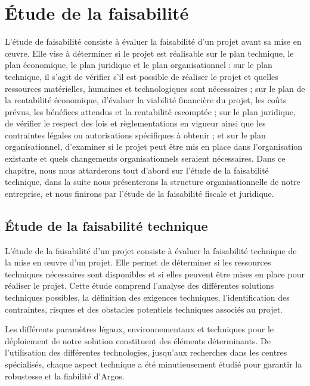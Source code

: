 
\setcounter{chapter}{2}
\chapter{Étude de la faisabilité}

L'étude de faisabilité consiste à évaluer la faisabilité d'un projet avant sa mise en œuvre. Elle vise à déterminer si le projet est réalisable sur le plan technique, le plan économique, le plan juridique et le plan organisationnel : sur le plan technique, il s'agit de vérifier s'il est possible de réaliser le projet et quelles ressources matérielles, humaines et technologiques sont nécessaires ; sur le plan de la rentabilité économique, d'évaluer la viabilité financière du projet, les coûts prévus, les bénéfices attendus et la rentabilité escomptée ; sur le plan juridique, de vérifier le respect des lois et règlementations en vigueur ainsi que les contraintes légales ou autorisations spécifiques à obtenir ; et sur le plan organisationnel, d'examiner si le projet peut être mis en place dans l'organisation existante et quels changements organisationnels seraient nécessaires. Dans ce chapitre, nous nous attarderons tout d'abord sur l'étude de la faisabilité technique, dans la suite nous présenterons la structure organisationnelle de notre entreprise, et nous finirons par l'étude de la faisabilité fiscale et juridique.

\section{Étude de la faisabilité technique}

L'étude de la faisabilité d'un projet consiste à évaluer la faisabilité technique de la mise en œuvre d'un projet. Elle permet de déterminer si les ressources techniques nécessaires sont disponibles et si elles peuvent être mises en place pour réaliser le projet. Cette étude comprend l'analyse des différentes solutions techniques possibles, la définition des exigences techniques, l'identification des contraintes, risques et des obstacles potentiels techniques associés au projet.

Les différents paramètres légaux, environnementaux et techniques pour le déploiement de notre solution constituent des éléments déterminants. De l'utilisation des différentes technologies, jusqu'aux recherches dans les centres spécialisés, chaque aspect technique a été minutieusement étudié pour garantir la robustesse et la fiabilité d'Argos.


